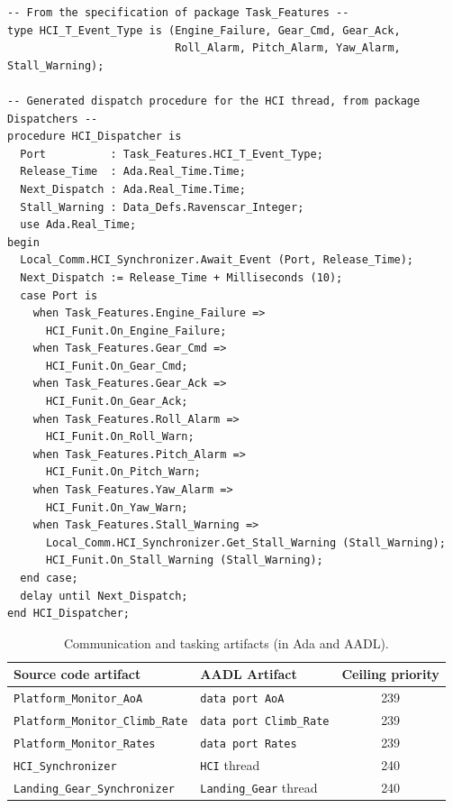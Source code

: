\begin{minipage}{\listingwidth}
\lstset{language=ada}
\begin{lstlisting}[label=lst:hci_dispatcher,caption=The dispatcher
    procedure for the \texttt{HCI} task.]
-- From the specification of package Task_Features --
type HCI_T_Event_Type is (Engine_Failure, Gear_Cmd, Gear_Ack, 
                          Roll_Alarm, Pitch_Alarm, Yaw_Alarm, Stall_Warning);

-- Generated dispatch procedure for the HCI thread, from package Dispatchers --
procedure HCI_Dispatcher is
  Port          : Task_Features.HCI_T_Event_Type;
  Release_Time  : Ada.Real_Time.Time;
  Next_Dispatch : Ada.Real_Time.Time;
  Stall_Warning : Data_Defs.Ravenscar_Integer;
  use Ada.Real_Time;
begin
  Local_Comm.HCI_Synchronizer.Await_Event (Port, Release_Time);
  Next_Dispatch := Release_Time + Milliseconds (10);
  case Port is
    when Task_Features.Engine_Failure =>
      HCI_Funit.On_Engine_Failure;
    when Task_Features.Gear_Cmd =>
      HCI_Funit.On_Gear_Cmd;
    when Task_Features.Gear_Ack =>
      HCI_Funit.On_Gear_Ack;
    when Task_Features.Roll_Alarm =>
      HCI_Funit.On_Roll_Warn;
    when Task_Features.Pitch_Alarm =>
      HCI_Funit.On_Pitch_Warn;
    when Task_Features.Yaw_Alarm =>
      HCI_Funit.On_Yaw_Warn;
    when Task_Features.Stall_Warning =>
      Local_Comm.HCI_Synchronizer.Get_Stall_Warning (Stall_Warning);
      HCI_Funit.On_Stall_Warning (Stall_Warning);
  end case;
  delay until Next_Dispatch;
end HCI_Dispatcher;
\end{lstlisting}
\end{minipage}

\begin{table}
\centering
\begin{tabular}{|l|l|c|}
\hline
\textbf{Source code artifact} & \textbf{AADL Artifact} &
\textbf{Ceiling priority}\\
\hline
\texttt{Platform\_Monitor\_AoA} & \texttt{data port AoA} & 239\\
\texttt{Platform\_Monitor\_Climb\_Rate} & \texttt{data port
  Climb\_Rate} & 239\\
\texttt{Platform\_Monitor\_Rates} & \texttt{data port Rates} & 239\\
\texttt{HCI\_Synchronizer} & \texttt{HCI} thread & 240\\
\texttt{Landing\_Gear\_Synchronizer} & \texttt{Landing\_Gear} thread &
240\\
\hline
\end{tabular}
\caption{Communication and tasking artifacts (in Ada and AADL).}
\label{tab:cs_local_comm}
\end{table}

